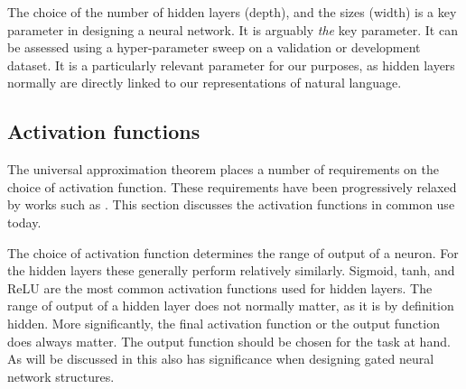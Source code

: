 \documentclass[12pt,parskip]{komatufte}
\begin{document}
The choice of the number of hidden layers (depth),
and the sizes (width) is a key parameter in designing a neural network.
It is arguably \emph{the} key parameter.
It can be assessed using a hyper-parameter sweep on a validation or development dataset.
It is a particularly relevant parameter for our purposes, as hidden layers normally are directly linked to our representations of natural language.





\subsection{Activation functions}


The universal approximation theorem places a number of requirements on the choice of activation function.
These requirements have been progressively relaxed by works such as \textcite{leshno1993uat, SONODA2017uat}.
This section discusses the activation functions in common use today.

The choice of activation function determines the range of output of a neuron.
For the hidden layers these generally perform relatively similarly.
Sigmoid, tanh, and ReLU are the most common activation functions used for hidden layers.
The range of output of a hidden layer does not normally matter, as it is by definition hidden.
More significantly, the final activation function or the output function does always matter.
The output function should be chosen for the task at hand.
As will be discussed in  this also has significance when designing gated neural network structures.

\end{document}

